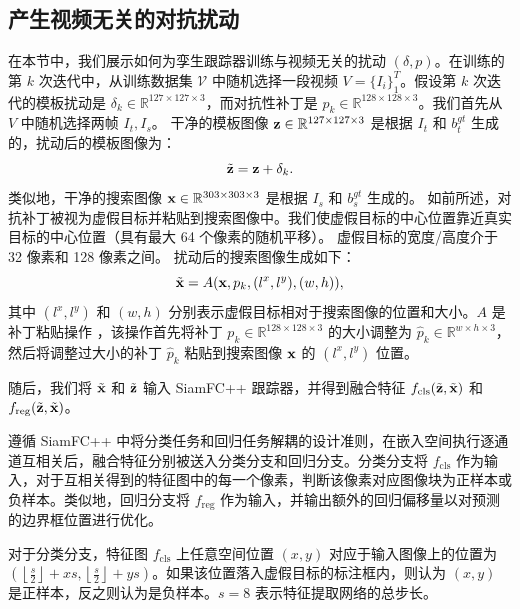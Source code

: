 \subsection{产生视频无关的对抗扰动}
在本节中，我们展示如何为孪生跟踪器训练与视频无关的扰动 $(\delta, p)$。在训练的第 $k$ 次迭代中，从训练数据集 $\mathcal V$ 中随机选择一段视频 $V=\{I_i\}_1^T$。假设第 $k$ 次迭代的模板扰动是 $\delta_k \in \mathbb{R}^{127\times 127 \times 3}$，而对抗性补丁是 $p_k \in \mathbb{R}^{128\times 128\times 3}$。我们首先从 $V$ 中随机选择两帧 $I_t, I_s$。
干净的模板图像 $\textbf z\in \mathbb{R}^{127\times 127 \times 3}$ 是根据 $I_t$ 和 $b^{gt}_t$ 生成的，扰动后的模板图像为：
\begin{equation}
\tilde {\textbf z} = \textbf z + \delta_k.
\end{equation}
类似地，干净的搜索图像 $\textbf x \in \mathbb{R}^{303\times 303 \times 3}$ 是根据 $I_s$ 和 $b^{gt}_s$ 生成的。
如前所述，对抗补丁被视为虚假目标并粘贴到搜索图像中。我们使虚假目标的中心位置靠近真实目标的中心位置（具有最大 64 个像素的随机平移）。
虚假目标的宽度/高度介于 32 像素和 128 像素之间。
扰动后的搜索图像生成如下：
\begin{equation}
\tilde{\textbf x} = A(\textbf x, p_k, (l^x, l^y), (w, h)),
\end{equation}
其中 $(l^x, l^y)$ 和 $(w, h)$ 分别表示虚假目标相对于搜索图像的位置和大小。$A$ 是补丁粘贴操作 \cite{patch}，该操作首先将补丁 $p_k \in \mathbb{R}^{128\times 128\times 3}$ 的大小调整为 $\hat{p}_k \in \mathbb{R}^{w\times h\times 3}$，然后将调整过大小的补丁 $\hat{p}_k$ 粘贴到搜索图像 $\textbf x$ 的 $(l^x,l^y)$ 位置。

随后，我们将 $\tilde {\textbf x}$ 和 $\tilde{\textbf z}$ 输入 SiamFC++ 跟踪器，并得到融合特征 $f_{\mathrm{cls}}(\tilde{\textbf z}, \tilde {\textbf x})$ 和 $f_{\mathrm{reg}}(\tilde{\textbf z}, \tilde {\textbf x})$。

遵循 SiamFC++ \cite{SiamFC++} 中将分类任务和回归任务解耦的设计准则，在嵌入空间执行逐通道互相关后，融合特征分别被送入分类分支和回归分支。分类分支将 $f_{\mathrm{cls}}$ 作为输入，对于互相关得到的特征图中的每一个像素，判断该像素对应图像块为正样本或负样本。类似地，回归分支将 $f_{\mathrm{reg}}$ 作为输入，并输出额外的回归偏移量以对预测的边界框位置进行优化。

对于分类分支，特征图 $f_{\mathrm{cls}}$ 上任意空间位置 $(x,y)$ 对应于输入图像上的位置为 $\left(\left\lfloor\frac{s}{2}\right\rfloor+x s,\left\lfloor\frac{s}{2}\right\rfloor+y s\right)$。如果该位置落入虚假目标的标注框内，则认为 $(x,y)$ 是正样本，反之则认为是负样本。$s=8$ 表示特征提取网络的总步长。

